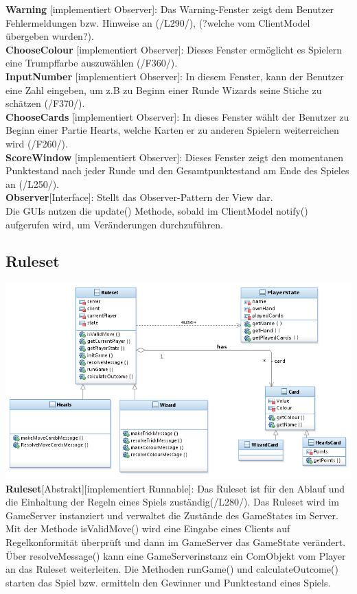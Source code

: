\documentclass{article}
\begin{document}
\textbf{Warning} [implementiert Observer]: Das Warning-Fenster zeigt dem Benutzer Fehlermeldungen bzw. Hinweise an (/L290/), (?welche vom ClientModel übergeben wurden?). \\

\textbf{ChooseColour} [implementiert Observer]: Dieses Fenster ermöglicht es Spielern eine Trumpffarbe auszuwählen (/F360/). \\

\textbf{InputNumber} [implementiert Observer]: In diesem Fenster, kann der Benutzer eine Zahl eingeben, um z.B zu Beginn einer Runde Wizards seine Stiche zu schätzen (/F370/). \\

\textbf{ChooseCards} [implementiert Observer]: In dieses Fenster wählt der Benutzer zu Beginn einer Partie Hearts, welche Karten er zu anderen Spielern weiterreichen wird (/F260/). \\

\textbf{ScoreWindow} [implementiert Observer]: Dieses Fenster zeigt den momentanen Punktestand nach jeder Runde und den Gesamtpunktestand am Ende des Spieles an (/L250/).\\

\textbf{Observer}[Interface]: Stellt das Observer-Pattern der View dar.\\
 Die GUIs nutzen die update() Methode, sobald im ClientModel notify() aufgerufen wird, um Veränderungen durchzuführen.

\subsection{Ruleset}
\includegraphics[width=\textwidth]{Ruleset}
		\textbf{Ruleset}[Abstrakt][implementiert Runnable]: Das Ruleset  ist für den Ablauf und die Einhaltung der Regeln eines Spiels zuständig(/L280/). Das Ruleset wird im GameServer instanziert und verwaltet die Zustände des GameStates im Server. Mit der Methode isValidMove() wird eine Eingabe eines Clients auf Regelkonformität überprüft und dann im GameServer  das GameState verändert. Über resolveMessage() kann eine GameServerinstanz ein ComObjekt vom Player an das Ruleset weiterleiten. Die Methoden runGame() und calculateOutcome() starten das Spiel bzw. ermitteln den Gewinner und Punktestand eines Spiels. \\ \\
		
\end{document}
